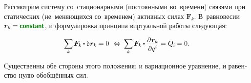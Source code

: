 \label{para:statics}

\begin{otherlanguage}{russian}

Рассмотрим систему со~стационарными (постоянными во~времени) связями при статических (не~меняющихся со~временем) активных силах ${\bm{F}_k}$.
В~равновесии ${\locationvector_k \hspace{-0.12ex} = \boldconstant}$, и формулировка принципа виртуальной работы следующая:

\nopagebreak\vspace{-0.1em}\begin{equation}\label{statics.discrete:principleofvirtualwork}
\scalebox{0.92}[0.96]{$ \displaystyle \sum_{\smash{k}} $} \hspace{.25ex}
\bm{F}_k \hspace{-0.1ex} \dotp \variation{\hspace{.1ex}\locationvector_k} \hspace{-0.1ex} = 0
\:\,\Leftrightarrow\:
\scalebox{0.92}[0.96]{$ \displaystyle \sum_{\smash{k}} $} \hspace{.25ex}
\bm{F}_k \hspace{-0.1ex} \dotp \scalebox{0.96}{$ \displaystyle \frac{\raisemath{-0.12em}{\partial \hspace{.1ex} \locationvector_k}}{\raisemath{-0.1em}{\partial q^i}} $}
= Q_{\hspace{-0.1ex}i} \hspace{-0.1ex} = 0 \hspace{.1ex} .
\vspace{-0.1em}\end{equation}

\vspace{-0.15em}\noindent
Существенны обе стороны этого положения: и вариационное уравнение, и равенство нулю обобщённых сил.


\end{otherlanguage}
